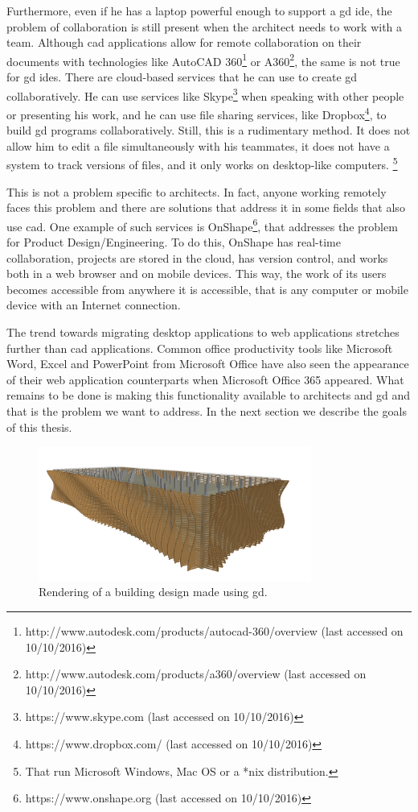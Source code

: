 Furthermore, even if he has a laptop powerful enough to support a \gls{gd} \gls{ide}, the problem of collaboration is still present when the architect needs to work with a team.
Although \gls{cad} applications allow for remote collaboration on their documents with technologies like AutoCAD 360\footnote{http://www.autodesk.com/products/autocad-360/overview (last accessed on 10/10/2016)} or A360\footnote{http://www.autodesk.com/products/a360/overview (last accessed on 10/10/2016)}, the same is not true for \gls{gd} \glspl{ide}.
There are cloud-based services that he can use to create \gls{gd} collaboratively.
He can use services like Skype\footnote{https://www.skype.com (last accessed on 10/10/2016)} when speaking with other people or presenting his work, and he can use file sharing services, like Dropbox\footnote{https://www.dropbox.com/ (last accessed on 10/10/2016)}, to build \gls{gd} programs collaboratively.
Still, this is a rudimentary method.
It does not allow him to edit a file simultaneously with his teammates, it does not have a system to track versions of files, and it only works on desktop-like computers.%
\footnote{That run Microsoft Windows, Mac OS or a *nix distribution.}

This is not a problem specific to architects.
In fact, anyone working remotely faces this problem and there are solutions that address it in some fields that also use \gls{cad}.
One example of such services is OnShape\footnote{https://www.onshape.org (last accessed on 10/10/2016)}, that addresses the problem for Product Design/Engineering.
To do this, OnShape has real-time collaboration, projects are stored in the cloud, has version control, and works both in a web browser and on mobile devices.
This way, the work of its users becomes accessible from anywhere it is accessible, that is any computer or mobile device with an Internet connection.

The trend towards migrating desktop applications to web applications stretches further than \gls{cad} applications.
Common office productivity tools like Microsoft Word, Excel and PowerPoint from Microsoft Office have also seen the appearance of their web application counterparts when Microsoft Office 365 appeared.
What remains to be done is making this functionality available to architects and \gls{gd} and that is the problem we want to address.
In the next section we describe the goals of this thesis.

\begin{figure}
	\centering
	\includegraphics[width=0.8\textwidth]{images/carmo_render}
	\caption{Rendering of a building design made using \gls{gd}.}
	\label{fig:carmo:render}
\end{figure}

